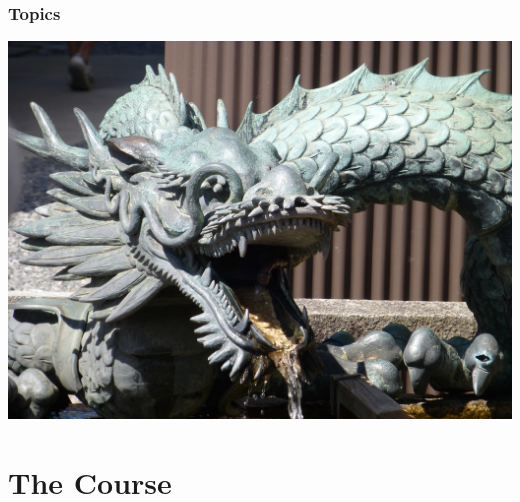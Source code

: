 \documentclass{beamer}
\begin{document}
\begin{frame}
  \PresentationTitleSlide
\end{frame}

\begin{frame}
 \frametitle{Topics}
 \tableofcontents
\end{frame}



\begin{frame}
\begin{center}
\includegraphics[scale=0.35]
	{figures/jpg/pic09.jpg}
\end{center}
\end{frame}

\section{The Course}
\end{document}
